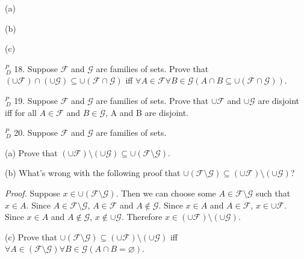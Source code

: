 \documentclass{article}
\begin{document}
(a)

\vspace{30pt}

(b)

\vspace{30pt}

(c)

\vspace{30pt}

$^{\textit{P}}_{\, \textit{D}}$ 18. Suppose $\mathcal{F}$ and $\mathcal{G}$ are families of sets. Prove that $(\cup\mathcal{F}) \cap (\cup\mathcal{G}) \subseteq \cup(\mathcal{F} \cap \mathcal{G})$ iff $\forall A \in \mathcal{F} \forall B \in \mathcal{G}(A \cap B \subseteq \cup(\mathcal{F} \cap \mathcal{G}))$.
\vspace{30pt}



\vspace{30pt}

$^{\textit{P}}_{\, \textit{D}}$ 19. Suppose $\mathcal{F}$ and $\mathcal{G}$ are families of sets. Prove that $\cup \mathcal{F}$ and $\cup \mathcal{G}$ are disjoint iff for all $A \in \mathcal{F}$ and $B \in \mathcal{G}$, A and B are disjoint.
\vspace{30pt}



\vspace{30pt}

$^{\textit{P}}_{\, \textit{D}}$ 20. Suppose $\mathcal{F}$ and $\mathcal{G}$ are families of sets.

\hspace{12pt}(a) Prove that $(\cup\mathcal{F}) \setminus (\cup\mathcal{G}) \subseteq \cup (\mathcal{F} \setminus \mathcal{G})$.

\hspace{12pt}(b) What's wrong with the following proof that $\cup(\mathcal{F} \setminus \mathcal{G}) \subseteq (\cup\mathcal{F}) \setminus (\cup\mathcal{G})$?

\textit{Proof.} Suppose $x \in \cup(\mathcal{F} \setminus \mathcal{G})$. Then we can choose some $A \in \mathcal{F} \setminus \mathcal{G}$ such that $x \in A$. Since $A \in \mathcal{F} \setminus \mathcal{G}$, $A \in \mathcal{F}$ and $A \notin \mathcal{G}$. Since $x \in A$ and $A \in \mathcal{F}$, $x \in \cup \mathcal{F}$. Since $x \in A$ and $A \notin \mathcal{G}$, $x \notin \cup \mathcal{G}$. Therefore $x \in (\cup \mathcal{F}) \setminus (\cup\mathcal{G})$.

\hspace{12pt}(c) Prove that $\cup(\mathcal{F} \setminus \mathcal{G}) \subseteq (\cup\mathcal{F}) \setminus (\cup\mathcal{G})$ iff $\forall A \in (\mathcal{F} \setminus \mathcal{G})\forall B \in \mathcal{G}(A \cap
B = \varnothing)$.
\end{document}

